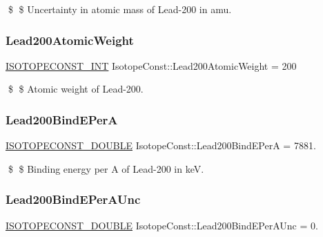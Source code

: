 \$ \$ Uncertainty in atomic mass of Lead-\/200 in amu. \mbox{\label{group___isotope_const-_lead-_pb200_ga8130ea7c5a868230459034e1b02aaad9}} 
\subsubsection{\texorpdfstring{Lead200\+Atomic\+Weight}{Lead200AtomicWeight}}
{\footnotesize\ttfamily \mbox{\hyperlink{group___isotope_const-_macros_ga5f18360b3e99483a35c32d789e62621c}{I\+S\+O\+T\+O\+P\+E\+C\+O\+N\+S\+T\+\_\+\+I\+NT}} Isotope\+Const\+::\+Lead200\+Atomic\+Weight = 200}

\$ \$ Atomic weight of Lead-\/200. \mbox{\label{group___isotope_const-_lead-_pb200_gad3b3271285c2b03abb208511d13da432}} 
\subsubsection{\texorpdfstring{Lead200\+Bind\+E\+PerA}{Lead200BindEPerA}}
{\footnotesize\ttfamily \mbox{\hyperlink{group___isotope_const-_macros_ga8f45a7272ce02c0b4c65c44636ed719a}{I\+S\+O\+T\+O\+P\+E\+C\+O\+N\+S\+T\+\_\+\+D\+O\+U\+B\+LE}} Isotope\+Const\+::\+Lead200\+Bind\+E\+PerA = 7881.}

\$ \$ Binding energy per A of Lead-\/200 in keV. \mbox{\label{group___isotope_const-_lead-_pb200_ga39078924f2ee4d45d225058b17cf4d8a}} 
\subsubsection{\texorpdfstring{Lead200\+Bind\+E\+Per\+A\+Unc}{Lead200BindEPerAUnc}}
{\footnotesize\ttfamily \mbox{\hyperlink{group___isotope_const-_macros_ga8f45a7272ce02c0b4c65c44636ed719a}{I\+S\+O\+T\+O\+P\+E\+C\+O\+N\+S\+T\+\_\+\+D\+O\+U\+B\+LE}} Isotope\+Const\+::\+Lead200\+Bind\+E\+Per\+A\+Unc = 0.}

